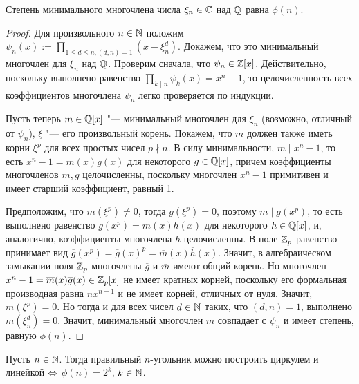 \begin{theorem}
	Степень минимального многочлена числа $\xi_n \in \mathbb{C}$ над $\mathbb{Q}$ равна $\phi(n)$.
\end{theorem}

\begin{proof}
	Для произвольного $n \in \mathbb{N}$ положим $\psi_n(x) := \prod_{1 \le d \le n, (d, n) = 1}(x - \xi_n^d)$. Докажем, что это минимальный многочлен для $\xi_n$ над $\mathbb{Q}$. Проверим сначала, что $\psi_n \in \mathbb{Z}[x]$. Действительно, поскольку выполнено равенство $\prod_{k \mid n}\psi_k(x) = {x^n - 1}$, то целочисленность всех коэффициентов многочлена $\psi_n$ легко проверяется по индукции.
	
	Пусть теперь $m \in \mathbb{Q}[x]$ "--- минимальный многочлен для $\xi_n$ (возможно, отличный от $\psi_n$), $\xi$ "--- его произвольный корень. Покажем, что $m$ должен также иметь корни $\xi^p$ для всех простых чисел $p \nmid n$. В силу минимальности, $m \mid x^n - 1$, то есть $x^n - 1 = m(x)g(x)$ для некоторого $g \in \mathbb{Q}[x]$, причем коэффициенты многочленов $m, g$ целочисленны, поскольку многочлен $x^n - 1$ примитивен и имеет старший коэффициент, равный 1.
	
	Предположим, что $m(\xi^p) \ne 0$, тогда $g(\xi^p) = 0$, поэтому $m \mid g(x^p)$, то есть выполнено равенство $g(x^p) = m(x)h(x)$ для некоторого $h \in \mathbb{Q}[x]$, и, аналогично, коэффициенты многочлена $h$ целочисленны. В поле $\mathbb{Z}_p$ равенство принимает вид $\overline{g}(x^p) = \overline{g}(x)^p = \overline{m}(x)\overline{h}(x)$. Значит, в алгебраическом замыкании поля $\mathbb{Z}_p$ многочлены $\overline{g}$ и $\overline{m}$ имеют общий корень. Но многочлен $x^n - 1 = \overline{m}(x)\overline{g}(x) \in \mathbb{Z}_p[x]$ не имеет кратных корней, поскольку его формальная производная равна $nx^{n - 1}$ и не имеет корней, отличных от нуля. Значит, $m(\xi^p) = 0$. Но тогда и для всех чисел $d \in \mathbb{N}$ таких, что $(d, n) = 1$, выполнено $m(\xi_n^d) = 0$. Значит, минимальный многочлен $m$ совпадает с $\psi_n$ и имеет степень, равную $\phi(n)$.
\end{proof}

\begin{corollary}
	Пусть $n \in \mathbb{N}$. Тогда правильный $n$-угольник можно построить циркулем и линейкой $\Leftrightarrow$ $\phi(n) = 2^k$, $k \in \mathbb{N}$.
\end{corollary}